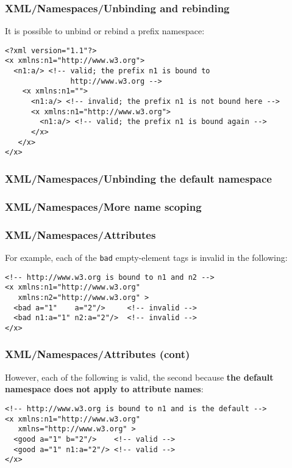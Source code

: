 %
\begin{frame}[containsverbatim]
\frametitle{XML/Namespaces/Unbinding and rebinding}

It is possible to unbind or rebind a prefix namespace:
{\small
\begin{verbatim}
<?xml version="1.1"?>
<x xmlns:n1="http://www.w3.org">
  <n1:a/> <!-- valid; the prefix n1 is bound to 
               http://www.w3.org -->
    <x xmlns:n1="">
      <n1:a/> <!-- invalid; the prefix n1 is not bound here -->
      <x xmlns:n1="http://www.w3.org">
        <n1:a/> <!-- valid; the prefix n1 is bound again -->
      </x>
   </x>
</x>
\end{verbatim}
}

\end{frame}

%
\begin{frame}
\frametitle{XML/Namespaces/Unbinding the default namespace}


\end{frame}

%
\begin{frame}
\frametitle{XML/Namespaces/More name scoping}


\end{frame}

%
\begin{frame}[containsverbatim]
\frametitle{XML/Namespaces/Attributes}

For example, each of the \texttt{bad} empty-element tags is invalid in
the following: 
\begin{verbatim}
<!-- http://www.w3.org is bound to n1 and n2 -->
<x xmlns:n1="http://www.w3.org" 
   xmlns:n2="http://www.w3.org" >
  <bad a="1"    a="2"/>     <!-- invalid -->
  <bad n1:a="1" n2:a="2"/>  <!-- invalid -->
</x>
\end{verbatim}

\end{frame}

%
\begin{frame}[containsverbatim]
\frametitle{XML/Namespaces/Attributes (cont)}

However, each of the following is valid, the second because
\textbf{the default namespace does not apply to attribute names}:
{\small
\begin{verbatim}
<!-- http://www.w3.org is bound to n1 and is the default -->
<x xmlns:n1="http://www.w3.org" 
   xmlns="http://www.w3.org" >
  <good a="1" b="2"/>    <!-- valid -->
  <good a="1" n1:a="2"/> <!-- valid -->
</x>
\end{verbatim}
}

\end{frame}

